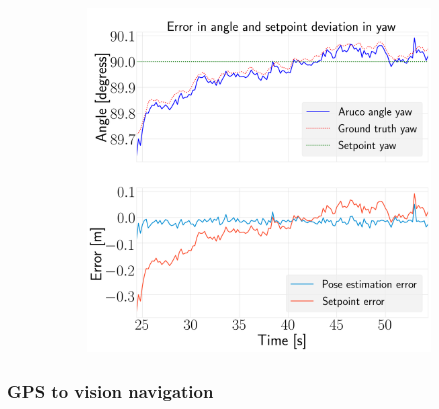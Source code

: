 \documentclass[../Head/report.tex]{subfiles}
\begin{document}
\begin{figure}[H]
\begin{subfigure}[t]{.30\textwidth}
        \caption{}
        \label{fig:hold_pose_estimation_test5_pitch}
    \end{subfigure}
     \hspace{0.2em}
    \begin{subfigure}[t]{.30\textwidth}
        \centering
        \includegraphics[width=\textwidth]{../Figures/hold_pose_using_aruco_pose_estimation/test5_landingBoard3_noWind/error_yaw/pose_error_yaw_test1.png}
        \caption{}
        \label{fig:hold_pose_estimation_test5_yaw}
    \end{subfigure}
    \caption{}
    \label{fig:hold_pose_estimation_test5_error_angle}
\end{figure}

\subsubsection{GPS to vision navigation}
\end{document}
